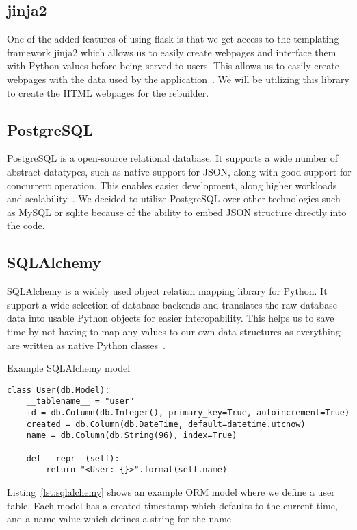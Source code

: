\documentclass[../Main/thesis.tex]{subfiles}
\begin{document}
\subsection*{jinja2}
One of the added features of using flask is that we get access to the templating
framework jinja2 which allows us to easily create webpages and interface them
with Python values before being served to users. This allows us to easily create
webpages with the data used by the application~\cite{jinja}. We will be
utilizing this library to create the HTML webpages for the rebuilder.

\subsection*{PostgreSQL}
PostgreSQL is a open-source relational database. It supports a wide number of
abstract datatypes, such as native support for JSON, along with good support for
concurrent operation. This enables easier development, along higher workloads
and scalability~\cite{pgsql}. We decided to utilize PostgreSQL over other
technologies such as MySQL or sqlite because of the ability to embed JSON
structure directly into the code. 

\subsection*{SQLAlchemy}
SQLAlchemy is a widely used object relation mapping library for Python. It
support a wide selection of database backends and translates the raw database
data into usable Python objects for easier interopability. This helps us to save
time by not having to map any values to our own data structures as everything
are written as native Python classes~\cite{sqlalchemy}.

\begin{listing}[ht]
\caption{Example SQLAlchemy model}
\label{lst:sqlalchemy}
\begin{verbatim}
class User(db.Model):
    __tablename__ = "user"
    id = db.Column(db.Integer(), primary_key=True, autoincrement=True)
    created = db.Column(db.DateTime, default=datetime.utcnow)
    name = db.Column(db.String(96), index=True)

    def __repr__(self):
        return "<User: {}>".format(self.name)
\end{verbatim}
\end{listing}

Listing~\ref{lst:sqlalchemy} shows an example ORM model where we define a user
table. Each model has a created timestamp which defaults to the current time,
and a name value which defines a string for the name
\end{document}
